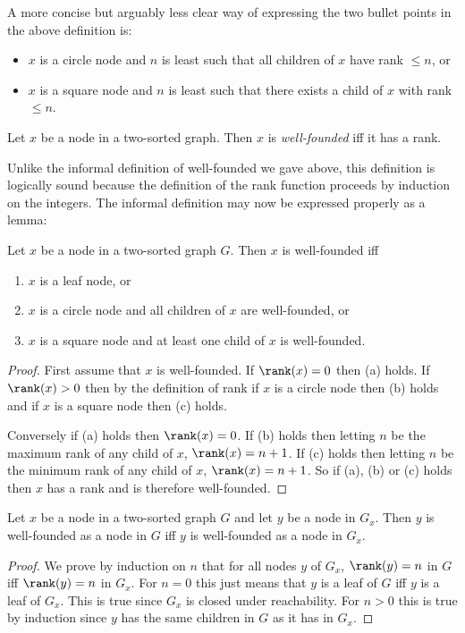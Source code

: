 \documentclass[oneside,12pt]{amsart}
\begin{document}
A more concise but arguably less clear way of expressing the two bullet points in the above definition is:

\begin{itemize}
\item $x$ is a circle node and $n$ is least such that all children of $x$ have rank $\leq n$, or
\item $x$ is a square node and $n$ is least such that there exists a child of $x$ with rank $\leq n$.
\end{itemize}

\begin{definition}
Let $x$ be a node in a two-sorted graph. Then $x$ is \emph{well-founded} iff it has a rank.
\end{definition}

Unlike the informal definition of well-founded we gave above, this definition is logically sound because
the definition of the rank function proceeds by induction on the integers. The informal definition may now
be expressed properly as a lemma:

\begin{lemma}
\label{SimpleDefOfWF}
Let $x$ be a node in a two-sorted graph $G$.  Then $x$ is well-founded iff
\begin{enumerate}
\item $x$ is a leaf node, or
\item $x$ is a circle node and all children of $x$ are well-founded, or
\item $x$ is a square node and at least one child of $x$ is well-founded.
\end{enumerate}
\end{lemma}
\begin{proof}
First assume that $x$ is well-founded. If $\rank(x) = 0$ then (a) holds.
If $\rank(x) > 0$ then by the definition of rank if $x$ is a circle node then (b)
holds and if $x$ is a square node then (c) holds.

Conversely if (a) holds then $\rank(x) = 0$. If (b) holds then letting $n$ be
the maximum rank of any child of $x$, $\rank(x) = n+1$. If (c) holds then letting
$n$ be the minimum rank of any child of $x$, $\rank(x) = n+1$. So if (a), (b) or (c)
holds then $x$ has a rank and is therefore well-founded.
\end{proof}

\begin{lemma}
\label{WellFoundedIsLocal}
Let $x$ be a node in a two-sorted graph $G$ and let $y$ be a node in $G_x$.
Then $y$ is well-founded as a node in $G$
iff $y$ is well-founded as a node in $G_x$.
\end{lemma}
\begin{proof}
We prove by induction on $n$ that for all nodes $y$ of $G_x$, $\rank(y) = n$  in $G$
iff $\rank(y) = n$  in $G_x$. For $n=0$ this just means that $y$ is a leaf of $G$ iff
$y$ is a leaf of $G_x$. This is true since $G_x$ is closed under reachability. For
$n>0$ this is true by induction since $y$ has the same children in $G$ as it has
in $G_x$.
\end{proof}
\end{document}
